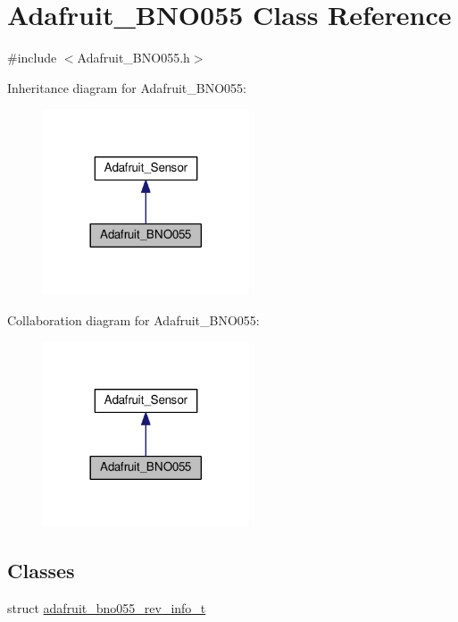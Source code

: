 \hypertarget{classAdafruit__BNO055}{}\section{Adafruit\+\_\+\+B\+N\+O055 Class Reference}
\label{classAdafruit__BNO055}


{\ttfamily \#include $<$Adafruit\+\_\+\+B\+N\+O055.\+h$>$}



Inheritance diagram for Adafruit\+\_\+\+B\+N\+O055\+:
\nopagebreak
\begin{figure}[H]
\begin{center}
\leavevmode
\includegraphics[width=173pt]{classAdafruit__BNO055__inherit__graph}
\end{center}
\end{figure}


Collaboration diagram for Adafruit\+\_\+\+B\+N\+O055\+:
\nopagebreak
\begin{figure}[H]
\begin{center}
\leavevmode
\includegraphics[width=173pt]{classAdafruit__BNO055__coll__graph}
\end{center}
\end{figure}
\subsection*{Classes}
\begin{DoxyCompactItemize}
\item 
struct \hyperlink{structAdafruit__BNO055_1_1adafruit__bno055__rev__info__t}{adafruit\+\_\+bno055\+\_\+rev\+\_\+info\+\_\+t}
\end{DoxyCompactItemize}
